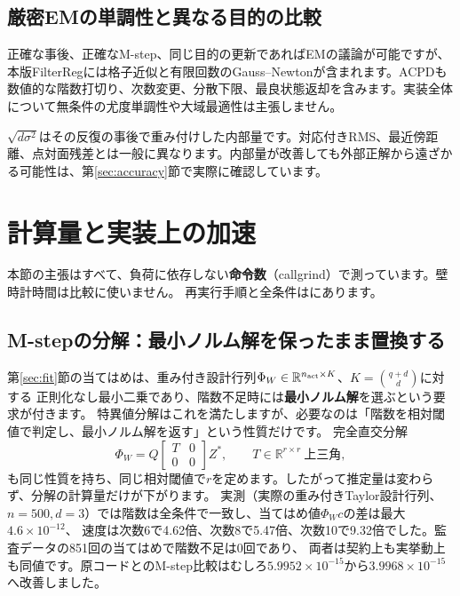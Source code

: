 \documentclass[a4paper,11pt]{article}
\numberwithin{equation}{section}
\begin{document}
\subsection{厳密EMの単調性と異なる目的の比較}
正確な事後、正確なM-step、同じ目的の更新であればEMの議論が可能ですが、本版FilterRegには格子近似と有限回数のGauss--Newtonが含まれます。ACPDも数値的な階数打切り、次数変更、分散下限、最良状態返却を含みます。実装全体について無条件の尤度単調性や大域最適性は主張しません。

\(\sqrt{d\sigma^2}\)はその反復の事後で重み付けした内部量です。対応付きRMS、最近傍距離、点対面残差とは一般に異なります。内部量が改善しても外部正解から遠ざかる可能性は、第\ref{sec:accuracy}節で実際に確認しています。

\section{計算量と実装上の加速}\label{sec:performance}
本節の主張はすべて、負荷に依存しない\textbf{命令数}（callgrind）で測っています。壁時計時間は比較に使いません。
再実行手順と全条件はにあります。

\subsection{M-stepの分解：最小ノルム解を保ったまま置換する}\label{sec:mstep-factorization}
第\ref{sec:fit}節の当てはめは、重み付き設計行列\(\Phi_W\in\mathbb R^{n_{\rm act}\times K}\)、\(K=\binom{q+d}{d}\)に対する
正則化なし最小二乗であり、階数不足時には\textbf{最小ノルム解}を選ぶという要求が付きます。
特異値分解はこれを満たしますが、必要なのは「階数を相対閾値で判定し、最小ノルム解を返す」という性質だけです。
完全直交分解
\begin{equation}
 \Phi_W=Q\begin{bmatrix}T&0\\0&0\end{bmatrix}Z^{*},\qquad T\in\mathbb R^{r\times r}\ \text{上三角},
\end{equation}
も同じ性質を持ち、同じ相対閾値で\(r\)を定めます。したがって推定量は変わらず、分解の計算量だけが下がります。
実測（実際の重み付きTaylor設計行列、\(n=500,d=3\)）では階数は全条件で一致し、当てはめ値\(\Phi_Wc\)の差は最大\(4.6\times10^{-12}\)、
速度は次数6で4.62倍、次数8で5.47倍、次数10で9.32倍でした。監査データの851回の当てはめで階数不足は0回であり、
両者は契約上も実挙動上も同値です。原コードとのM-step比較はむしろ\(5.9952\times10^{-15}\)から\(3.9968\times10^{-15}\)へ改善しました。
\end{document}
